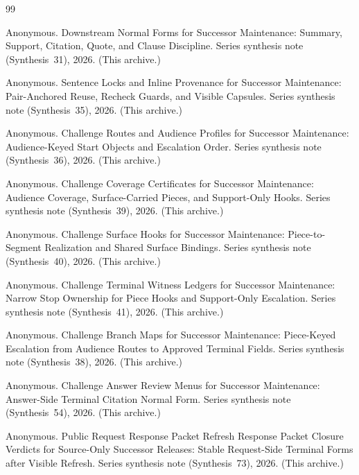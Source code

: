 \documentclass[11pt]{article}
\begin{document}
\begin{thebibliography}{99}\small

Anonymous.
\newblock Downstream Normal Forms for Successor Maintenance: Summary, Support, Citation, Quote, and Clause Discipline.
\newblock Series synthesis note (Synthesis~31), 2026. (This archive.)

Anonymous.
\newblock Sentence Locks and Inline Provenance for Successor Maintenance: Pair-Anchored Reuse, Recheck Guards, and Visible Capsules.
\newblock Series synthesis note (Synthesis~35), 2026. (This archive.)

Anonymous.
\newblock Challenge Routes and Audience Profiles for Successor Maintenance: Audience-Keyed Start Objects and Escalation Order.
\newblock Series synthesis note (Synthesis~36), 2026. (This archive.)

Anonymous.
\newblock Challenge Coverage Certificates for Successor Maintenance: Audience Coverage, Surface-Carried Pieces, and Support-Only Hooks.
\newblock Series synthesis note (Synthesis~39), 2026. (This archive.)

Anonymous.
\newblock Challenge Surface Hooks for Successor Maintenance: Piece-to-Segment Realization and Shared Surface Bindings.
\newblock Series synthesis note (Synthesis~40), 2026. (This archive.)

Anonymous.
\newblock Challenge Terminal Witness Ledgers for Successor Maintenance: Narrow Stop Ownership for Piece Hooks and Support-Only Escalation.
\newblock Series synthesis note (Synthesis~41), 2026. (This archive.)

Anonymous.
\newblock Challenge Branch Maps for Successor Maintenance: Piece-Keyed Escalation from Audience Routes to Approved Terminal Fields.
\newblock Series synthesis note (Synthesis~38), 2026. (This archive.)

Anonymous.
\newblock Challenge Answer Review Menus for Successor Maintenance: Answer-Side Terminal Citation Normal Form.
\newblock Series synthesis note (Synthesis~54), 2026. (This archive.)

Anonymous.
\newblock Public Request Response Packet Refresh Response Packet Closure Verdicts for Source-Only Successor Releases: Stable Request-Side Terminal Forms after Visible Refresh.
\newblock Series synthesis note (Synthesis~73), 2026. (This archive.)


\end{thebibliography}
\end{document}

